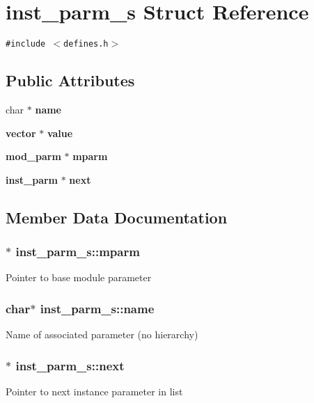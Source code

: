 \section{inst\_\-parm\_\-s Struct Reference}
\label{structinst__parm__s}
{\tt \#include $<$defines.h$>$}

\subsection*{Public Attributes}
\begin{CompactItemize}
\item 
char $\ast$ {\bf name}
\item 
{\bf vector} $\ast$ {\bf value}
\item 
{\bf mod\_\-parm} $\ast$ {\bf mparm}
\item 
{\bf inst\_\-parm} $\ast$ {\bf next}
\end{CompactItemize}


\subsection{Member Data Documentation}
\subsubsection{$\ast$ inst\_\-parm\_\-s::mparm}\label{structinst__parm__s_m2}


Pointer to base module parameter 
\subsubsection{\setlength{\rightskip}{0pt plus 5cm}char$\ast$ inst\_\-parm\_\-s::name}\label{structinst__parm__s_m0}


Name of associated parameter (no hierarchy) 
\subsubsection{$\ast$ inst\_\-parm\_\-s::next}\label{structinst__parm__s_m3}


Pointer to next instance parameter in list 
